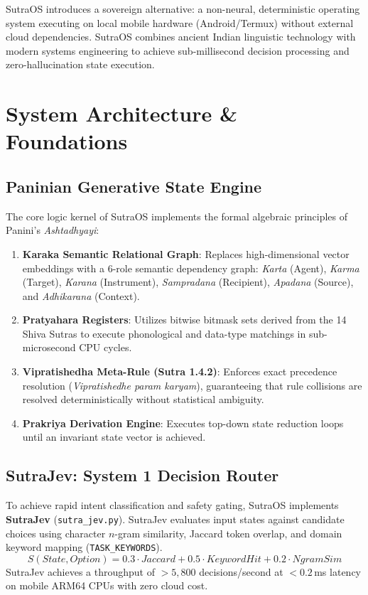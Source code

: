 \documentclass[10pt,journal,compsoc]{IEEEtran}
\begin{document}
SutraOS introduces a sovereign alternative: a non-neural, deterministic operating system executing on local mobile hardware (Android/Termux) without external cloud dependencies. SutraOS combines ancient Indian linguistic technology with modern systems engineering to achieve sub-millisecond decision processing and zero-hallucination state execution.

\section{System Architecture \& Foundations}

\subsection{Paninian Generative State Engine}
The core logic kernel of SutraOS implements the formal algebraic principles of Panini's \textit{Ashtadhyayi}:
\begin{enumerate}
    \item \textbf{Karaka Semantic Relational Graph}: Replaces high-dimensional vector embeddings with a 6-role semantic dependency graph: \textit{Karta} (Agent), \textit{Karma} (Target), \textit{Karana} (Instrument), \textit{Sampradana} (Recipient), \textit{Apadana} (Source), and \textit{Adhikarana} (Context).
    \item \textbf{Pratyahara Registers}: Utilizes bitwise bitmask sets derived from the 14 Shiva Sutras to execute phonological and data-type matchings in sub-microsecond CPU cycles.
    \item \textbf{Vipratishedha Meta-Rule (Sutra 1.4.2)}: Enforces exact precedence resolution (\textit{Vipratishedhe param karyam}), guaranteeing that rule collisions are resolved deterministically without statistical ambiguity.
    \item \textbf{Prakriya Derivation Engine}: Executes top-down state reduction loops until an invariant state vector is achieved.
\end{enumerate}

\subsection{SutraJev: System 1 Decision Router}
To achieve rapid intent classification and safety gating, SutraOS implements \textbf{SutraJev} (\texttt{sutra\_jev.py}). SutraJev evaluates input states against candidate choices using character $n$-gram similarity, Jaccard token overlap, and domain keyword mapping (\texttt{TASK\_KEYWORDS}). 
\begin{equation}
S(State, Option) = 0.3 \cdot Jaccard + 0.5 \cdot KeywordHit + 0.2 \cdot NgramSim
\end{equation}
SutraJev achieves a throughput of $>5,800$ decisions/second at $<0.2$\,ms latency on mobile ARM64 CPUs with zero cloud cost.
\end{document}
